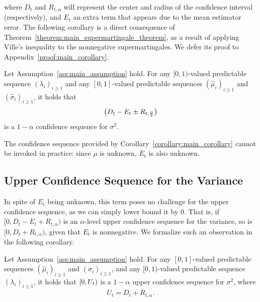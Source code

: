 where $D_t$ and $R_{t, \alpha}$ will represent the center and radius of the confidence interval (respectively), and $E_t$ an extra term that appears due to the mean estimator error. The following corollary is a direct consequence of Theorem~\ref{theorem:main_supermartingale_theorem}, as a result of applying Ville's inequality to the nonnegative supermartingales. We defer its proof to Appendix~\ref{proof:main_corollary}.
\begin{corollary} \label{corollary:main_corollary}
    Let Assumption~\ref{ass:main_assumption} hold.  For any $[0, 1)$-valued predictable sequence $(\lambda_i)_{i \geq 1}$ and any $[0, 1]$-valued predictable sequences $(\widehat\mu_i)_{i \geq 1}$ and $(\widehat\sigma_i)_{i \geq 1}$, it holds that
    \begin{align*}
    \left( D_t -  E_t \pm R_{t, \frac{\alpha}{2}}\right)
\end{align*}
is a $1-\alpha$ confidence sequence for $\sigma^2$.
\end{corollary}
The confidence sequence provided by Corollary~\ref{corollary:main_corollary} cannot be invoked in practice: since $\mu$ is unknown, $E_t$ is also unknown.

\subsection{Upper Confidence Sequence for the Variance} \label{section:upper_bound}

In spite of $E_t$ being unknown, this term poses no challenge for the upper confidence sequence, as we can simply lower bound it by $0$. That is, if $[0, D_t - E_t + R_{t, \alpha})$ is an $\alpha$-level upper confidence sequence for the variance, so is $[0, D_t + R_{t, \alpha})$, given that $E_t$ is nonnegative. We formalize such an observation in the following corollary. %
\begin{corollary}  \label{corollary:upper_bound}
    Let Assumption~\ref{ass:main_assumption} hold.  For any $[0, 1]$-valued predictable sequences $(\widehat\mu_i)_{i \geq 1}$ and $(\widehat\sigma_i)_{i \geq 1}$, and any $[0, 1)$-valued predictable sequence $(\lambda_i)_{i \geq 1}$, it holds that $\left[ 0, U_t\right)$ is a $1-\alpha$ upper confidence sequence for $\sigma^2$, where
    \begin{align*}
        U_t = D_t+ R_{t, \alpha}.
    \end{align*}
\end{corollary}



